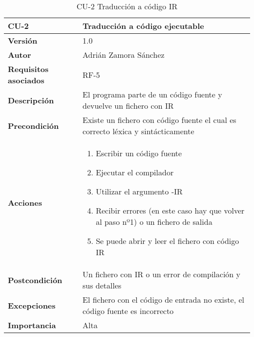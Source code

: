 \begin{table}[p]
	\centering
	\begin{tabularx}{\linewidth}{ p{} p{} }
		\toprule
		\textbf{CU-2}    & \textbf{Traducción a código ejecutable}\\
		\toprule
		\textbf{Versión}              & 1.0    \\
		\textbf{Autor}                & Adrián Zamora Sánchez \\
		\textbf{Requisitos asociados} & RF-5\\
		\textbf{Descripción}          & El programa parte de un código fuente y devuelve un fichero con IR \\
		\textbf{Precondición}         & Existe un fichero con código fuente el cual es correcto léxica y sintácticamente \\
		\textbf{Acciones}             &
		\begin{enumerate}
			\def\labelenumi{\arabic{enumi}.}
			\tightlist
			\item Escribir un código fuente
			\item Ejecutar el compilador
			\item Utilizar el argumento -IR
			\item Recibir errores (en este caso hay que volver al paso nº1) o un fichero de salida 
			\item Se puede abrir y leer el fichero con código IR
		\end{enumerate}\\
		\textbf{Postcondición}        & Un fichero con IR o un error de compilación y sus detalles \\
		\textbf{Excepciones}          & El fichero con el código de entrada no existe, el código fuente es incorrecto \\
		\textbf{Importancia}          & Alta \\ 
		\bottomrule
	\end{tabularx}
	\caption{CU-2 Traducción a código IR}
\end{table}

